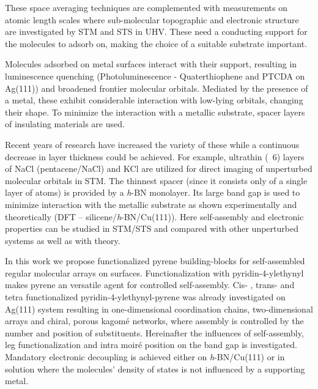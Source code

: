 These space averaging techniques are complemented with measurements on atomic length scales where sub-molecular topographic and electronic structure are investigated by STM and STS in UHV. These need a conducting support for the molecules to adsorb on, making the choice of a suitable substrate important.

Molecules adsorbed on metal surfaces interact with their support, resulting in luminescence quenching (Photoluminescence - Quaterthiophene and PTCDA on Ag(111))\cite{Gebauer_Luminescence_2004} and broadened frontier molecular orbitals. Mediated by the presence of a metal, these exhibit considerable interaction with low-lying orbitals, changing their shape\cite{Chavy_Interpretation_1993}. To minimize the interaction with a metallic substrate, spacer layers of insulating materials are used. 

Recent years of research have increased the variety of these while a continuous decrease in layer thickness could be achieved. For example, ultrathin (~6) layers of NaCl (pentacene/NaCl)\cite{Repp_molecules_2005} and KCl\cite{Koslowski_adsorption_2017} are utilized for direct imaging of unperturbed molecular orbitals in STM. The thinnest spacer (since it consists only of a single layer of atoms) is provided by a \textit{h}-BN monolayer. Its large band gap is used to minimize interaction with the metallic substrate as shown experimentally\cite{joshi_boron_2012} and theoretically (DFT – silicene/\textit{h}-BN/Cu(111))\cite{Kanno_Electronic_2014}. Here self-assembly and electronic properties can be studied in STM/STS and compared with other unperturbed systems as well as with theory. 

In this work we propose functionalized pyrene building-blocks\cite{Casas-Solvas_Synthesis_2014,Feng_functionalization_2016} for self-assembled regular molecular arrays on surfaces. Functionalization with pyridin-4-ylethynyl\cite{Figueira-Duarte_Pyrene_2011} makes pyrene an versatile agent for controlled self-assembly. Cis- , trans- and tetra functionalized pyridin-4-ylethynyl-pyrene was already investigated on Ag(111) system resulting in one-dimensional coordination chains, two-dimensional arrays and chiral, porous kagom\'e networks, where assembly is controlled by the number and position of substituents.\cite{Kaposi_Supramolecular_2016} 
Hereinafter the influences of self-assembly, leg functionalization\cite{Kurata_donor_2017} and intra moir\'e position\cite{Sushobhan_Control_2014} on the band gap is investigated. Mandatory electronic decoupling is achieved either on \textit{h}-BN/Cu(111) or in solution where the molecules’ density of states is not influenced by a supporting metal.


